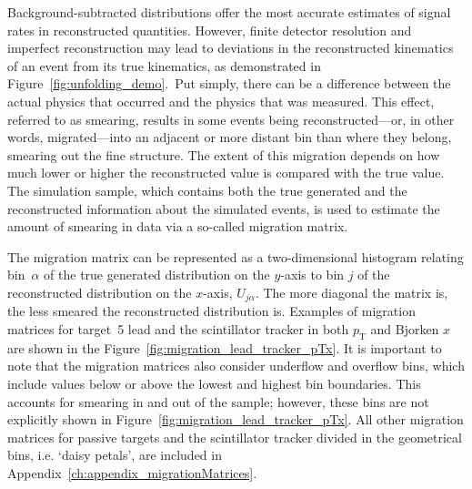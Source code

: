 Background-subtracted distributions offer the most accurate estimates of signal rates in reconstructed quantities. However, finite detector resolution and imperfect reconstruction may lead to deviations in the reconstructed kinematics of an event from its true kinematics, as demonstrated in Figure~\ref{fig:unfolding_demo}.~Put simply, there can be a difference between the actual physics that occurred and the physics that was measured. This effect, referred to as smearing, results in some events being reconstructed---or, in other words, migrated---into an adjacent or more distant bin than where they belong, smearing out the fine structure. The extent of this migration depends on how much lower or higher the reconstructed value is compared with the true value. The simulation sample, which contains both the true generated and the reconstructed information about the simulated events, is used to estimate the amount of smearing in data via a so-called migration matrix. 

The migration matrix can be represented as a two-dimensional histogram relating bin~$\alpha$ of the true generated distribution on the $y$-axis to bin $j$ of the reconstructed distribution on the $x$-axis, $U_{j\alpha}$. The more diagonal the matrix is, the less smeared the reconstructed distribution is. Examples of migration matrices for target~5 lead and the scintillator tracker in both $p_{\text{T}}$ and Bjorken $x$ are shown in the Figure~\ref{fig:migration_lead_tracker_pTx}. It is important to note that the migration matrices also consider underflow and overflow bins, which include values below or above the lowest and highest bin boundaries. This accounts for smearing in and out of the sample; however, these bins are not explicitly shown in Figure~\ref{fig:migration_lead_tracker_pTx}. All other migration matrices for passive targets and the scintillator tracker divided in the geometrical bins, i.e. `daisy petals', are included in Appendix~\ref{ch:appendix_migrationMatrices}.

